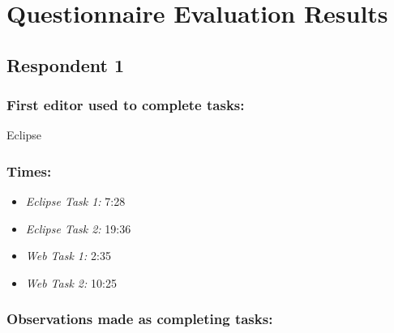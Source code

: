 \documentclass{report}
\begin{document}





\section{Questionnaire Evaluation Results}\label{questionnaireEvalResults}

\subsection{Respondent 1}
\subsubsection*{First editor used to complete tasks:} Eclipse
\subsubsection*{Times:}
\begin{itemize}
\item \emph{Eclipse Task 1:} 7:28
\item \emph{Eclipse Task 2:} 19:36
\item \emph{Web Task 1:} 2:35
\item \emph{Web Task 2:} 10:25
\end{itemize}
\subsubsection*{Observations made as completing tasks:}
\end{document}
